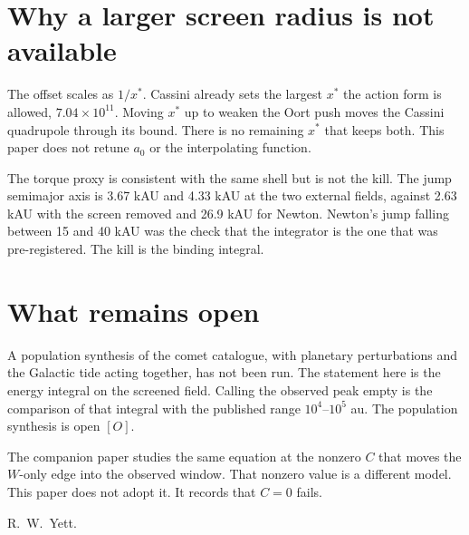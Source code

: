 \documentclass[11pt]{article}
\begin{document}
\section{Why a larger screen radius is not available}

The offset scales as \(1/x^*\). Cassini already sets the largest \(x^*\) the action form is allowed, \(7.04\times 10^{11}\). Moving \(x^*\) up to weaken the Oort push moves the Cassini quadrupole through its bound. There is no remaining \(x^*\) that keeps both. This paper does not retune \(a_0\) or the interpolating function.

The torque proxy is consistent with the same shell but is not the kill. The jump semimajor axis is 3.67 kAU and 4.33 kAU at the two external fields, against 2.63 kAU with the screen removed and 26.9 kAU for Newton. Newton's jump falling between 15 and 40 kAU was the check that the integrator is the one that was pre-registered. The kill is the binding integral.

\section{What remains open}

A population synthesis of the comet catalogue, with planetary perturbations and the Galactic tide acting together, has not been run. The statement here is the energy integral on the screened field. Calling the observed peak empty is the comparison of that integral with the published range \(10^{4}\)--\(10^{5}\) au. The population synthesis is open \([O]\).

The companion paper studies the same equation at the nonzero \(C\) that moves the \(W\)-only edge into the observed window. That nonzero value is a different model. This paper does not adopt it. It records that \(C = 0\) fails.

\vspace{2em}
\noindent R.~W.~Yett.
\end{document}
